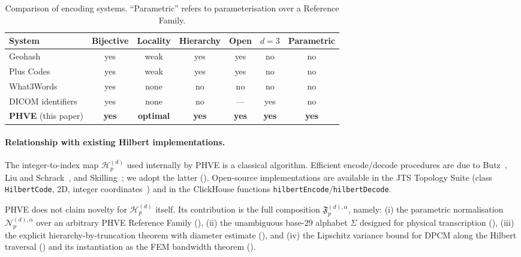 \documentclass[11pt,a4paper]{article}
\theoremstyle{plain}
\theoremstyle{definition}
\theoremstyle{remark}
\newcommand{\Hil}{\mathcal{H}}
\newcommand{\Nor}{\mathcal{N}}
\newcommand{\Fc}{\mathfrak{F}}
\begin{document}
\begin{table}[!htbp]
\centering
\small
\setlength{\tabcolsep}{4pt}
\begin{tabular}{lcccccc}
\toprule
System & Bijective & Locality & Hierarchy & Open & $d=3$ & Parametric \\
\midrule
Geohash~\cite{niemeyer2008}      & yes & weak    & yes & yes & no  & no \\
Plus Codes~\cite{google2014}     & yes & weak    & yes & yes & no  & no \\
What3Words                        & yes & none    & no  & no  & no  & no \\
DICOM identifiers                 & yes & none    & no  & ---  & yes & no \\
\textbf{PHVE} (this paper)        & \textbf{yes} & \textbf{optimal} & \textbf{yes}
   & \textbf{yes} & \textbf{yes} & \textbf{yes} \\
\bottomrule
\end{tabular}
\caption{Comparison of encoding systems. ``Parametric'' refers to
parameterisation over a Reference Family.}
\label{tab:comparison}
\end{table}

\paragraph{Relationship with existing Hilbert implementations.}
The integer-to-index map $\Hil_p^{(d)}$ used internally by PHVE is a
classical algorithm. Efficient encode/decode procedures are due to
Butz~\cite{butz1971}, Liu and Schrack~\cite{liu1996}, and
Skilling~\cite{skilling2004}; we adopt the latter
(). Open-source implementations are available
in the JTS Topology Suite (class \texttt{HilbertCode}, 2D, integer
coordinates~\cite{jts}) and in the ClickHouse functions
\texttt{hilbertEncode}/\texttt{hilbertDecode}.

PHVE does not claim novelty for $\Hil_p^{(d)}$ itself. Its contribution
is the full composition $\Fc_p^{(d),\alpha}$, namely:
(i) the parametric normalisation $\Nor_p^{(d),\alpha}$ over an arbitrary
PHVE Reference Family (),
(ii) the unambiguous base-$29$ alphabet $\Sigma$ designed for physical
transcription (),
(iii) the explicit hierarchy-by-truncation theorem with diameter
estimate (), and
(iv) the Lipschitz variance bound for DPCM along the Hilbert traversal
() and its instantiation as the FEM bandwidth theorem
().
\end{document}
